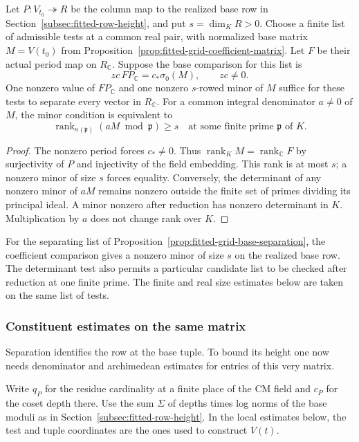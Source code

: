 \begin{auxlemma}\label{lem:fitted-base-minor}
Let \(P:V_{t_0}\twoheadrightarrow R\) be the column map to the realized base row in Section~\ref{subsec:fitted-row-height}, and put \(s=\dim_KR>0\). Choose a finite list of admissible tests at a common real pair, with normalized base matrix \(M=V(t_0)\) from Proposition~\ref{prop:fitted-grid-coefficient-matrix}. Let \(F\) be their actual period map on \(R_\mathbb C\). Suppose the base comparison for this list is
\[
                  zc\,F P_{\mathbb C}=c_*\sigma_0(M),\qquad zc\ne0 .
\]
One nonzero value of \(FP_{\mathbb C}\) and one nonzero \(s\)-rowed minor of \(M\) suffice for these tests to separate every vector in \(R_\mathbb C\). For a common integral denominator \(a\ne0\) of \(M\), the minor condition is equivalent to
\[
     \operatorname{rank}_{\kappa(\mathfrak p)}(aM\bmod\mathfrak p)\ge s
     \quad\text{at some finite prime }\mathfrak p\text{ of }K .
\]
\end{auxlemma}
\begin{proof}
The nonzero period forces \(c_*\ne0\). Thus \(\operatorname{rank}_K M=\operatorname{rank}_{\mathbb C}F\) by surjectivity of \(P\) and injectivity of the field embedding. This rank is at most \(s\); a nonzero minor of size \(s\) forces equality. Conversely, the determinant of any nonzero minor of \(aM\) remains nonzero outside the finite set of primes dividing its principal ideal. A minor nonzero after reduction has nonzero determinant in \(K\). Multiplication by \(a\) does not change rank over \(K\).
\end{proof}

For the separating list of Proposition~\ref{prop:fitted-grid-base-separation}, the coefficient comparison gives a nonzero minor of size \(s\) on the realized base row. The determinant test also permits a particular candidate list to be checked after reduction at one finite prime. The finite and real size estimates below are taken on the same list of tests.

\subsubsection{Constituent estimates on the same matrix}

Separation identifies the row at the base tuple. To bound its height one now needs denominator and archimedean estimates for entries of this very matrix.

Write \(q_P\) for the residue cardinality at a finite place of the CM field and \(c_P\) for the coset depth there. Use
the sum \(\Sigma\) of depths times log norms of the base
moduli as in Section~\ref{subsec:fitted-row-height}.
In the local estimates below, the test and tuple coordinates are
the ones used to construct \(V(t)\).

